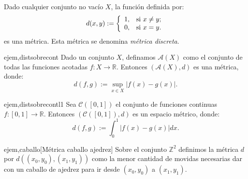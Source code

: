 \begin{ejemplo}{} Dado cualquier conjunto no vacío $X$, la
función definida por:
\[
	d(x,y):=\left\{
\begin{array}{ll}
	1, & \hbox{si $x\neq y$;} \\
	0, & \hbox{si $x=y$.} \\
\end{array}
\right.
\]
es una métrica. Esta métrica se denomina \emph{métrica
discreta}.
\end{ejemplo}

\begin{ejemplo}{ejem,distsobrecont} Dado un conjunto $X$,
definamos $\mathcal{A}(X)$
como el conjunto de todas las funciones acotadas $f:X\rightarrow
\mathbb{R}$. Entonces $(\mathcal{A}(X),d)$ es una métrica,
donde:
\begin{equation}\label{convunifmet}
	d(f,g):=\sup\limits_{x\in X}|f(x)-g(x)|.
\end{equation}
\end{ejemplo}

\begin{ejemplo}{ejem,distsobrecontl1} Sea $\mathcal{C}([0,1])$
el conjunto de funciones
continuas $f:[0,1]\rightarrow\mathbb{R}$. Entonces\linebreak
$(\mathcal{C}([0,1]),d)$ es un espacio métrico, donde:
\begin{equation}\label{l1metint}
	d(f,g):=\int_0^1|f(x)-g(x)|dx.
\end{equation}
\end{ejemplo}


\begin{ejemplo}{ejem,caballo}[Métrica caballo ajedrez] Sobre el conjunto $\mathbb{Z}^2$ definimos la métrica $d$ por $d((x_0,y_0),(x_1,y_1))$  como la menor cantidad de movidas necesarias dar con un caballo de ajedrez para ir desde $(x_0,y_0)$ a $(x_1,y_1)$.  
\end{ejemplo}



